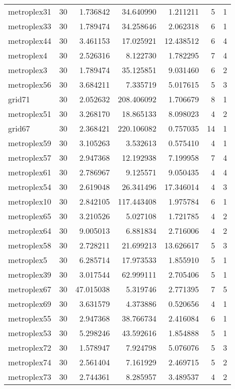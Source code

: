\begin{longtable}{|l|r|r|r|r|r|r|}
metroplex31 & 30 & 1.736842 & 34.640990 & 1.211211 & 5 & 1 \\
metroplex33 & 30 & 1.789474 & 34.258646 & 2.062318 & 6 & 1 \\
metroplex44 & 30 & 3.461153 & 17.025921 & 12.438512 & 6 & 4 \\
metroplex4 & 30 & 2.526316 & 8.122730 & 1.782295 & 7 & 4 \\
metroplex3 & 30 & 1.789474 & 35.125851 & 9.031460 & 6 & 2 \\
metroplex56 & 30 & 3.684211 & 7.335719 & 5.017615 & 5 & 3 \\
grid71 & 30 & 2.052632 & 208.406092 & 1.706679 & 8 & 1 \\
metroplex51 & 30 & 3.268170 & 18.865133 & 8.098023 & 4 & 2 \\
grid67 & 30 & 2.368421 & 220.106082 & 0.757035 & 14 & 1 \\
metroplex59 & 30 & 3.105263 & 3.532613 & 0.575410 & 4 & 1 \\
metroplex57 & 30 & 2.947368 & 12.192938 & 7.199958 & 7 & 4 \\
metroplex61 & 30 & 2.786967 & 9.125571 & 9.050435 & 4 & 4 \\
metroplex54 & 30 & 2.619048 & 26.341496 & 17.346014 & 4 & 3 \\
metroplex10 & 30 & 2.842105 & 117.443408 & 1.975784 & 6 & 1 \\
metroplex65 & 30 & 3.210526 & 5.027108 & 1.721785 & 4 & 2 \\
metroplex64 & 30 & 9.005013 & 6.881834 & 2.716006 & 4 & 2 \\
metroplex58 & 30 & 2.728211 & 21.699213 & 13.626617 & 5 & 3 \\
metroplex5 & 30 & 6.285714 & 17.973533 & 1.855910 & 5 & 1 \\
metroplex39 & 30 & 3.017544 & 62.999111 & 2.705406 & 5 & 1 \\
metroplex67 & 30 & 47.015038 & 5.319746 & 2.771395 & 7 & 5 \\
metroplex69 & 30 & 3.631579 & 4.373886 & 0.520656 & 4 & 1 \\
metroplex55 & 30 & 2.947368 & 38.766734 & 2.416084 & 6 & 1 \\
metroplex53 & 30 & 5.298246 & 43.592616 & 1.854888 & 5 & 1 \\
metroplex72 & 30 & 1.578947 & 7.924798 & 5.076076 & 5 & 3 \\
metroplex74 & 30 & 2.561404 & 7.161929 & 2.469715 & 5 & 2 \\
metroplex73 & 30 & 2.744361 & 8.285957 & 3.489537 & 4 & 2 \\

\end{longtable}
